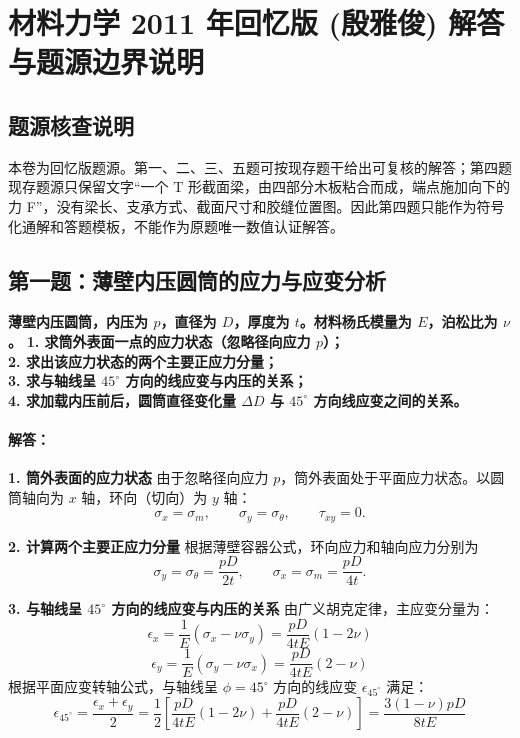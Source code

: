 \documentclass[11pt,a4paper]{ctexrep}
\begin{document}
\chapter{材料力学 2011 年回忆版 (殷雅俊) 解答与题源边界说明}
{



\section*{题源核查说明}

本卷为回忆版题源。第一、二、三、五题可按现存题干给出可复核的解答；第四题现存题源只保留文字“一个 T 形截面梁，由四部分木板粘合而成，端点施加向下的力 F”，没有梁长、支承方式、截面尺寸和胶缝位置图。因此第四题只能作为符号化通解和答题模板，不能作为原题唯一数值认证解答。

\section*{第一题：薄壁内压圆筒的应力与应变分析}

\textbf{薄壁内压圆筒，内压为 $p$，直径为 $D$，厚度为 $t$。材料杨氏模量为 $E$，泊松比为 $\nu$。}
\textbf{1. 求筒外表面一点的应力状态（忽略径向应力 $p$）；}\\
\textbf{2. 求出该应力状态的两个主要正应力分量；}\\
\textbf{3. 求与轴线呈 $45^\circ$ 方向的线应变与内压的关系；}\\
\textbf{4. 求加载内压前后，圆筒直径变化量 $\Delta D$ 与 $45^\circ$ 方向线应变之间的关系。}

\subsubsection*{解答：}

\textbf{1. 筒外表面的应力状态}
由于忽略径向应力 $p$，筒外表面处于平面应力状态。以圆筒轴向为 $x$ 轴，环向（切向）为 $y$ 轴：
\[
\sigma_x = \sigma_m,\qquad
\sigma_y = \sigma_\theta,\qquad
\tau_{xy}=0.
\]

\textbf{2. 计算两个主要正应力分量}
根据薄壁容器公式，环向应力和轴向应力分别为
\[
\sigma_y = \sigma_\theta = \frac{p D}{2 t},\qquad
\sigma_x = \sigma_m = \frac{p D}{4 t}.
\]

\textbf{3. 与轴线呈 $45^\circ$ 方向的线应变与内压的关系}
由广义胡克定律，主应变分量为：
\[
\epsilon_x = \frac{1}{E} (\sigma_x - \nu \sigma_y) = \frac{p D}{4 t E} (1 - 2\nu)
\]
\[
\epsilon_y = \frac{1}{E} (\sigma_y - \nu \sigma_x) = \frac{p D}{4 t E} (2 - \nu)
\]
根据平面应变转轴公式，与轴线呈 $\phi = 45^\circ$ 方向的线应变 $\epsilon_{45^\circ}$ 满足：
\[
\epsilon_{45^\circ} = \frac{\epsilon_x + \epsilon_y}{2} = \frac{1}{2} \left[ \frac{p D}{4 t E} (1 - 2\nu) + \frac{p D}{4 t E} (2 - \nu) \right] = \frac{3(1-\nu) p D}{8 t E}
\]

}
\end{document}
